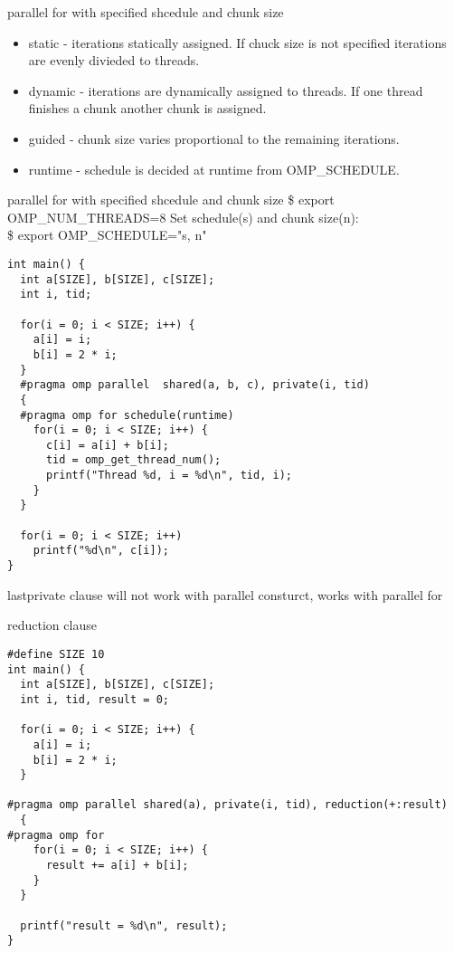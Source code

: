 \documentclass[10pt]{beamer}
\begin{document}
\begin{frame}[fragile]{parallel for with specified shcedule and chunk size}
\begin{itemize}
\item static - iterations statically assigned. If chuck size is not specified
iterations are evenly divieded to threads.
\item dynamic - iterations are dynamically assigned to threads. If one thread
finishes a chunk another chunk is assigned.
\item guided - chunk size varies proportional to the remaining iterations.
\item runtime - schedule is decided at runtime from OMP\_SCHEDULE.
\end{itemize}
\end{frame}

\begin{frame}{parallel for with specified shcedule and chunk size}
\$ export OMP\_NUM\_THREADS=8
Set schedule(s) and chunk size(n):\\
\$ export OMP\_SCHEDULE="s, n"
\begin{Verbatim}[fontsize=\small, formatcom=\color{red}]
int main() {
  int a[SIZE], b[SIZE], c[SIZE];
  int i, tid;

  for(i = 0; i < SIZE; i++) {
    a[i] = i;
    b[i] = 2 * i;
  }
  #pragma omp parallel  shared(a, b, c), private(i, tid)
  {
  #pragma omp for schedule(runtime)
    for(i = 0; i < SIZE; i++) {
      c[i] = a[i] + b[i];
      tid = omp_get_thread_num();
      printf("Thread %d, i = %d\n", tid, i);
    }
  }

  for(i = 0; i < SIZE; i++)
    printf("%d\n", c[i]);
}
\end{Verbatim}
\end{frame}

\begin{frame}[fragile]{lastprivate clause}
will not work with parallel consturct, works with parallel for
\end{frame}

\begin{frame}[fragile]{reduction clause}
\begin{Verbatim}[fontsize=\small, formatcom=\color{red}]
#define SIZE 10
int main() {
  int a[SIZE], b[SIZE], c[SIZE];
  int i, tid, result = 0;

  for(i = 0; i < SIZE; i++) {
    a[i] = i;
    b[i] = 2 * i;
  }

#pragma omp parallel shared(a), private(i, tid), reduction(+:result)
  {
#pragma omp for
    for(i = 0; i < SIZE; i++) {
      result += a[i] + b[i];
    }
  }

  printf("result = %d\n", result);
}
\end{Verbatim}
\end{frame}
\end{document}
